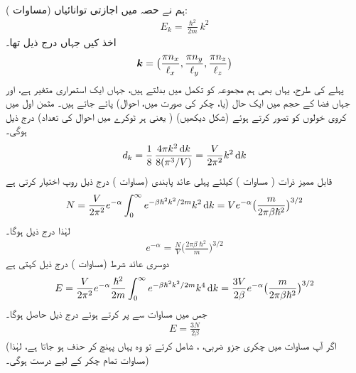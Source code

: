 ہم نے حصہ  میں اجازتی توانائیاں (مساوات ):
\begin{align}
E_k = \frac{\hslash^2}{2 m} k^2
\end{align}
اخذ کیں جہاں درج ذیل تھا۔
\begin{align*}
{\ensuremath{{\boldsymbol{k}}}} = \big ( \frac{\pi n_x}{\ell_x} , \frac{\pi n_y}{\ell_y} , \frac{\pi n_z}{\ell_z} \big )
\end{align*}
پہلے کی طرح، یہاں بھی ہم مجموعہ کو تکمل میں بدلتے ہیں، جہاں  ایک استمراری متغیر ہے، اور جہاں  فضا کے  حجم میں ایک حال (یا، چکر  کی صورت میں،  احوال) پائے جاتے ہیں۔ مثمن اول میں کروی خولوں کو  تصور کرتے ہوئے (شکل  دیکھیں)  ( یعنی ہر ٹوکرے میں احوال کی تعداد) درج ذیل ہوگی۔
\begin{align}\label{مساوات_متماثل_انحطاط_خول_کی}
d_k = \frac{1}{8}\, \frac{4 \pi k^2 \dif k}{8 (\pi^3 /V)} = \frac{V}{2 \pi^2} k^2 \dif k
\end{align}
قابل ممیز ذرات ( مساوات ) کیلئے پہلی عائد پابندی (مساوات ) درج ذیل روپ اختیار کرتی ہے 
\begin{align*}
N = \frac{V}{2 \pi^2} e^{- \alpha} \int_0^{\infty} e^{- \beta \hslash^2 k^2 / 2m} k^2 \dif k = V e^{- \alpha} \big ( \frac{m}{2 \pi \beta \hslash^2} \big )^{3/2}
\end{align*}
لہٰذا درج ذیل ہوگا۔
\begin{align}\label{مساوات_متماثل_درمیانہ_نتیجہ}
e^{- \alpha} = \frac{N}{V} \big ( \frac{2 \pi \beta \hslash^2}{m} \big )^{3/2}
\end{align}
دوسری عائد شرط (مساوات ) درج ذیل کہتی ہے 
\begin{align*}
E = \frac{V}{2 \pi^2} e^{- \alpha} \frac{\hslash^2}{2 m} \int_0^\infty e^{- \beta \hslash^2 k^2 /2m} k^4 \dif k = \frac{3 V}{2 \beta} e^{- \alpha} \big ( \frac{m}{2 \pi \beta \hslash^2} \big )^{3/2}
\end{align*}
جس میں مساوات  سے  پر کرتے ہوئے درج ذیل حاصل ہوگا۔
\begin{align}\label{مساوات_متماثل_درست_ہر_صورت}
E = \frac{3 N}{2 \beta}
\end{align}
(اگر آپ مساوات  میں چکری جزو ضربی، ، شامل کرتے تو وہ یہاں پہنچ کر حذف ہو جاتا ہے، لہٰذا مساوات  تمام چکر کے لیے درست ہوگی۔) 

